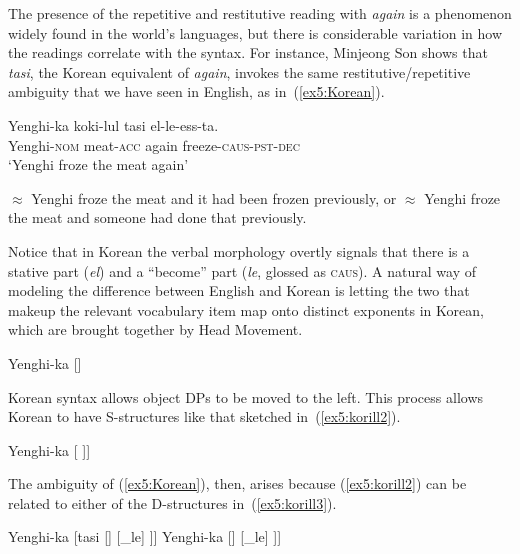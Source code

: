 The presence of the repetitive and restitutive reading with \emph{again} is a phenomenon widely found in the world's languages, but there is considerable variation in how the readings correlate with the syntax. For instance, Minjeong Son\cite{Son:2006} shows that \emph{tasi}, the Korean equivalent of \emph{again}, invokes the same restitutive/repetitive ambiguity that we have seen in English, as in~(\ref{ex5:Korean}).
\pagebreak
\begin{exe}
	\raggedright
	\ex \label{ex5:Korean} 
	\gll Yenghi-ka koki-lul tasi el-le-ess-ta. \\ Yenghi-\textsc{nom} meat-\textsc{acc} again freeze-\textsc{caus}-\textsc{pst}-\textsc{dec} \\ `Yenghi froze the meat again'
	\begin{xlist}
		\ex $\approx$ Yenghi froze the meat and it had been frozen previously, or
		\ex $\approx$ Yenghi froze the meat and someone had done that previously.
	\end{xlist}
	\hspace*{\fill} \citep[(49):~59)]{Son:2006} \hspace*{.5in} 
\end{exe}
Notice that in Korean the verbal morphology overtly signals that there is a stative part (\emph{el}) and a ``become'' part (\emph{le}, glossed as \textsc{caus}). A natural way of modeling the difference between English and Korean is letting the two  that makeup the relevant vocabulary item map onto distinct exponents in Korean, which are brought together by Head Movement.
\begin{exe}
	\raggedright
	\ex \label{ex5:korill1} 
	Yenghi-ka [\VP [\VP koki-lul \linkfrom{\ } \under ] [_{\text{\obar{V}}}\to{el} le] ]
\end{exe}
Korean syntax allows object DPs to be moved to the left. This process allows Korean to have S-structures like that sketched in~(\ref{ex5:korill2}).
\begin{exe}
	\raggedright
	\ex \label{ex5:korill2} 
	Yenghi-ka [\XP {} \under [\VP [\VP \from{\ }  ] [_{\text{\obar{V}}}el le] ]]
\end{exe}
The ambiguity of (\ref{ex5:Korean}), then, arises because (\ref{ex5:korill2}) can be related to either of the D-structures in~(\ref{ex5:korill3}).
\begin{exe}
	\raggedright
	\ex \label{ex5:korill3} 
	\begin{xlist}
		\ex Yenghi-ka [\VP tasi [\VP [\VP koki-lul [_{\text{\obar{V}}}el] ] [_{}le] ]]
		\ex Yenghi-ka [\VP [\VP tasi [\VP koki-lul [_{\text{\obar{V}}}el] ] [_{}le] ]]
	\end{xlist}
\end{exe}
